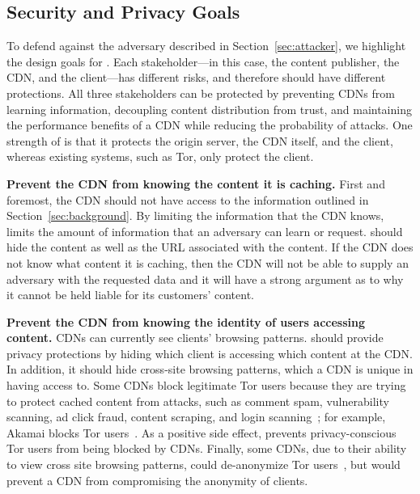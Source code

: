 \subsection{Security and Privacy Goals}
\label{sec:goals}

To defend against the adversary described in Section~\ref{sec:attacker}, we
highlight the design goals for \system{}.  Each stakeholder---in this case,
the content publisher, the CDN, and the client---has different risks, and
therefore should have different protections.  All three stakeholders  can be
protected by preventing CDNs from learning information, decoupling content
distribution from trust, and  maintaining the performance benefits of a CDN
while reducing the probability of attacks.   One strength of \system{} is that
it protects the origin server, the CDN itself, and the client, whereas
existing systems, such as Tor, only protect the client.


\textbf{Prevent the CDN from knowing the content it is caching.} First and foremost, the CDN 
should not have access to the information outlined 
in Section~\ref{sec:background}.  By limiting the information that the CDN knows,
\system{} limits 
the amount of information that an adversary can learn or request.  \system{} should hide 
the content as well as the URL associated with the content.  If the CDN 
does not know what content it is caching, then the CDN will not be able to supply an adversary 
with the requested data and it will have a strong argument as to why it cannot be held 
liable for its customers' content.

\textbf{Prevent the CDN from knowing the identity of users accessing content.} CDNs can currently see clients' 
browsing patterns. \system{} should provide privacy protections by hiding which client is accessing 
which content at the CDN.  In addition, it should hide cross-site browsing patterns,
which a CDN 
is unique in having access to.  Some CDNs block legitimate Tor users because they are 
trying to protect cached content from attacks, such as comment spam, vulnerability scanning, 
ad click fraud, content scraping, and login scanning~\cite{ars_tor}; for example,
Akamai blocks Tor users~\cite{khattak2016you}. As a positive side effect, \system{}
prevents
privacy-conscious Tor users from being blocked by CDNs.  Finally, some CDNs, due
to their ability
to view cross site browsing patterns, could de-anonymize Tor users~\cite{cloudflare_tor}, but \system{} would 
prevent a CDN from compromising the anonymity of clients.


